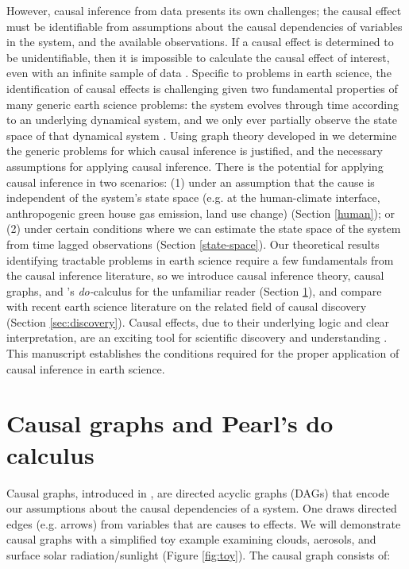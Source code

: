 \documentclass[12pt]{article}
\begin{document}
However, causal inference from data presents its own challenges; the
causal effect must be identifiable from assumptions about the causal
dependencies of variables in the system, and the available
observations. If a causal effect is determined to be unidentifiable,
then it is impossible to calculate the causal effect of interest, even
with an infinite sample of data \citep[][]{shpitser2006}. Specific to
problems in earth science, the identification of causal effects is
challenging given two fundamental properties of many generic earth
science problems: the system evolves through time according to an
underlying dynamical system, and we only ever partially observe the
state space of that dynamical system \citep{majda-state}. Using graph
theory developed in \citep{pearl1995causal} we determine the generic
problems for which causal inference is justified, and the necessary
assumptions for applying causal inference. There is the potential for
applying causal inference in two scenarios: (1) under an assumption
that the cause is independent of the system's state space (e.g. at the
human-climate interface, anthropogenic green house gas emission, land
use change) (Section \ref{human}); or (2) under certain conditions
where we can estimate the state space of the system from time lagged
observations (Section \ref{state-space}).  Our theoretical results
identifying tractable problems in earth science require a few
fundamentals from the causal inference literature, so we introduce
causal inference theory, causal graphs, and \citet{pearl2009}'s
\textit{do-}calculus for the unfamiliar reader (Section
\ref{sec:causal-graphs-pearls}), and compare with recent earth science
literature on the related field of causal discovery (Section
\ref{sec:discovery}). Causal effects, due to their underlying logic
and clear interpretation, are an exciting tool for scientific
discovery and understanding \citep{hannart-da,naveau-2020}. This
manuscript establishes the conditions required for the proper
application of causal inference in earth science.

\section{Causal graphs and Pearl's do calculus}
\label{sec:causal-graphs-pearls}

Causal graphs, introduced in \citep{pearl1995causal}, are directed
acyclic graphs (DAGs) that encode our assumptions about the causal
dependencies of a system. One draws directed edges (e.g. arrows) from
variables that are causes to effects. We will demonstrate causal
graphs with a simplified toy example examining clouds, aerosols, and
surface solar radiation/sunlight (Figure \ref{fig:toy}). The causal
graph consists of:
\end{document}
